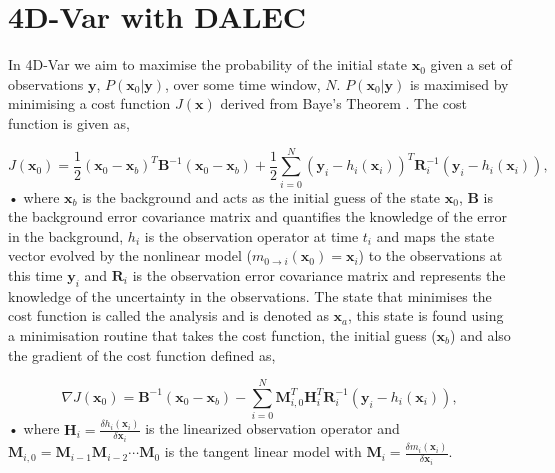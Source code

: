 \documentclass[11pt]{article}
\begin{document}
\section{4D-Var with DALEC}

In 4D-Var we aim to maximise the probability of the initial state $\textbf{x}_0$ given a set of observations $\textbf{y}$, $P(\textbf{x}_0|\textbf{y})$, over some time window, $N$.  $P(\textbf{x}_0|\textbf{y})$ is maximised by minimising a cost function $J(\textbf{x})$ derived from Baye's Theorem \cite{lewis2006dynamic}. The cost function is given as,

\begin{equation}
J(\textbf{x}_0) = \frac{1}{2}(\textbf{x}_0-\textbf{x}_b)^{T}\textbf{B}^{-1}(\textbf{x}_0-\textbf{x}_b)+\frac{1}{2}\sum_{i=0}^{N}(\textbf{y}_i-h_i(\textbf{x}_i))^{T}\textbf{R}_{i}^{-1}(\textbf{y}_i-h_i(\textbf{x}_i)),
\end{equation}•
where $\textbf{x}_b$ is the background and acts as the initial guess of the state $\textbf{x}_0$, $\textbf{B}$ is the background error covariance matrix and quantifies the knowledge of the error in the background, $h_i$ is the observation operator at time $t_i$ and maps the state vector evolved by the nonlinear model ($m_{0\rightarrow i}(\mathbf{x}_{0})=\textbf{x}_i$) to the observations at this time $\textbf{y}_i$ and $\textbf{R}_i$ is the observation error covariance matrix and represents the knowledge of the uncertainty in the observations. The state that minimises the cost function is called the analysis and is denoted as $\textbf{x}_a$, this state is found using a minimisation routine that takes the cost function, the initial guess ($\textbf{x}_b$) and also the gradient of the cost function defined as,

\begin{equation}
\nabla J(\textbf{x}_0) = \textbf{B}^{-1}(\textbf{x}_0-\textbf{x}_b)-\sum_{i=0}^{N}\textbf{M}_{i,0}^{T}\textbf{H}_i^{T}\textbf{R}_{i}^{-1}(\textbf{y}_i-h_i(\textbf{x}_i)),
\end{equation}•
where $\textbf{H}_i = \frac{\delta h_i(\textbf{x}_i)}{\delta\textbf{x}_i}$ is the linearized observation operator and $\mathbf{M}_{i,0}=\mathbf{M}_{i-1}\mathbf{M}_{i-2}\cdots\mathbf{M}_0$ is the tangent linear model with $\mathbf{M}_i=\frac{\delta m_{i}(\textbf{x}_{i})}{\delta \textbf{x}_{i}}$.
\end{document}
